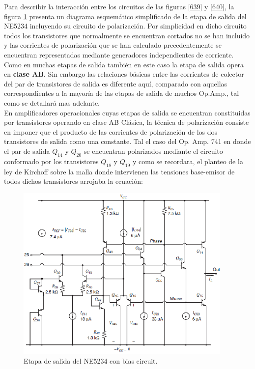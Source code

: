 \documentclass[12pt,a4paper,final,headinclude,footinclude,BCOR5mm]{scrartcl}
\begin{document}
Para describir la interacción entre los circuitos de las figuras \ref{639} y \ref{640}, la figura \ref{641} presenta un diagrama esquemático simplificado de la etapa de salida del NE5234 incluyendo su circuito de polarización. Por simplicidad en dicho circuito todos los transistores que normalmente se encuentran cortados no se han incluido y las corrientes de polarización que se han calculado precedentemente se encuentran representadas mediante generadores independientes de corriente. Como en muchas etapas de salida también en este caso la etapa de salida opera en \textbf{clase AB}. Sin embargo las relaciones básicas entre las corrientes de colector del par de transistores de salida es diferente aquí, comparado con aquellas correspondientes a la mayoría de las etapas de salida de muchos Op.Amp., tal como se detallará mas adelante.\\

En amplificadores operacionales cuyas etapas de salida se encuentran constituidas por transistores operando en clase AB Clásica, la técnica de polarización consiste en imponer que el producto de las corrientes de polarización de los dos transistores de salida como una constante. Tal el caso del Op. Amp. 741 en donde el par de salida $Q_{14}$ y $Q_{20}$ se encuentran polarizados mediante el circuito conformado por los transistores $Q_{18}$ y $Q_{19}$ y como se recordara, el planteo de la ley de Kirchoff sobre la malla donde intervienen las tensiones base-emisor de todos dichos transistores arrojaba la ecuación:

\begin{figure}[!h]
\begin{center}
\includegraphics[width=300pt]{./imagenes/neoutputbias.png}
\end{center}
\caption{Etapa de salida del NE5234 con bias circuit.}
\label{641}
\end{figure}
\end{document}
